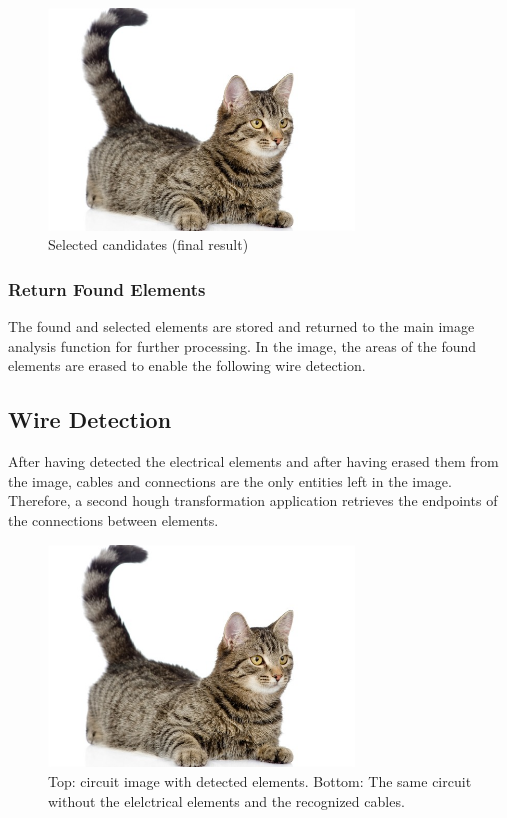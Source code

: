 \documentclass[10pt,twocolumn,letterpaper]{article}
\begin{document}
\begin{figure}[!ht]
\includegraphics[width = 3.2in]{img/cat.jpg}
\caption{Selected candidates (final result)}
\label{fig:detRS2}
\end{figure}

\subsubsection*{Return Found Elements}

The found and selected elements are stored and returned to the main image analysis function for further processing. In the image, the areas of the found elements are erased to enable the following wire detection.

\subsection{Wire Detection}
\label{subsec:wire}

After having detected the electrical elements and after having erased them from the image, cables and connections are the only entities left in the image. Therefore, a second hough transformation application retrieves the endpoints of the connections between elements.
\par

\begin{figure}[!ht]
\includegraphics[width = 3.2in]{img/cat.jpg}
\caption{Top: circuit image with detected elements. Bottom: The same circuit without the elelctrical elements and the recognized cables.}
\label{fig:c10}
\end{figure}
\end{document}
